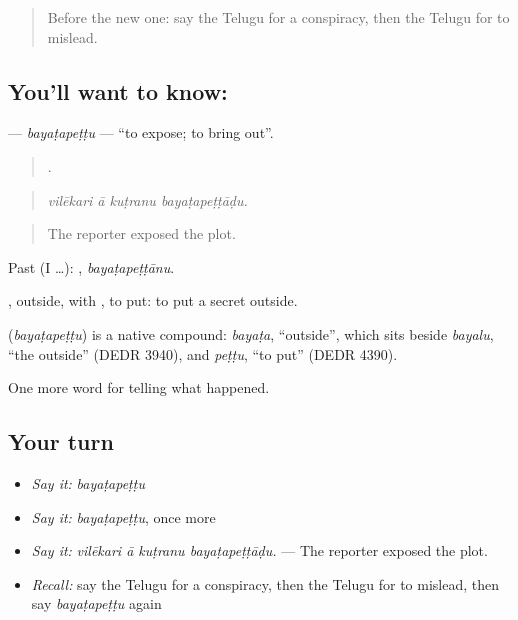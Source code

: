 \label{lesson:TE-C354-bayatapettu}



\begin{quote}
Before the new one: say the Telugu for a conspiracy, then the Telugu for to mislead.
\end{quote}

\subsection*{You'll want to know: }
\textbf{} — \emph{bayaṭapeṭṭu} — \textquotedblleft{}to expose; to bring out\textquotedblright{}.

\begin{quote}
   .
\end{quote}

\begin{quote}
\emph{vilēkari ā kuṭranu bayaṭapeṭṭāḍu.}
\end{quote}

\begin{quote}
The reporter exposed the plot.
\end{quote}

Past (I …): , \emph{bayaṭapeṭṭānu}.

, outside, with , to put: to put a secret outside.

\begin{cousinweb}
\textbf{} (\emph{bayaṭapeṭṭu}) is a native compound: \emph{bayaṭa}, \textquotedblleft{}outside\textquotedblright{}, which sits beside \emph{bayalu}, \textquotedblleft{}the outside\textquotedblright{} (DEDR 3940), and \emph{peṭṭu}, \textquotedblleft{}to put\textquotedblright{} (DEDR 4390).
\end{cousinweb}

\begin{grammarlens}[title={What you've built}]
One more word for telling what happened.
\end{grammarlens}

\subsection*{Your turn}
\begin{itemize}
\raggedright
  \item \emph{Say it:} \emph{bayaṭapeṭṭu}
  \item \emph{Say it:} \emph{bayaṭapeṭṭu}, once more
  \item \emph{Say it:} \emph{vilēkari ā kuṭranu bayaṭapeṭṭāḍu.} — The reporter exposed the plot.
  \item \emph{Recall:} say the Telugu for a conspiracy, then the Telugu for to mislead, then say \emph{bayaṭapeṭṭu} again
\end{itemize}

